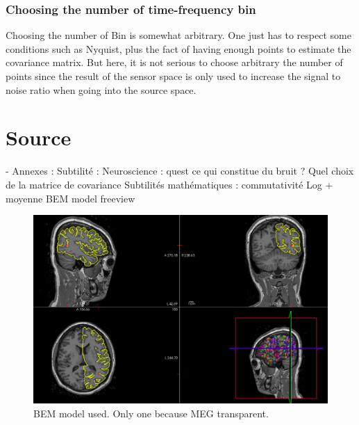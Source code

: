 \subsection{Choosing the number of time-frequency bin}

Choosing the number of Bin is somewhat arbitrary. One just has to respect some conditions such as Nyquist, plus the fact of having enough points to estimate the covariance matrix. But here, it is not serious to choose arbitrary the number of points since the result of the sensor space is only used to increase the signal to noise ratio when going into the source space.

\chapter{Source}

- Annexes : Subtilité :
Neuroscience : quest ce qui constitue du bruit ? Quel choix de la matrice de covariance
Subtilités mathématiques :  commutativité Log + moyenne
BEM model freeview



\begin{figure}[ht]
    \centering
    \includegraphics[width=15cm]{images_report/source/BEM_model_freeview_cropped.png}
    \caption[Segemntentation results visualized on Freeview.]%
    {BEM model used. Only one because MEG transparent.}
    \label{BEM_model_freeview_cropped}
\end{figure}
